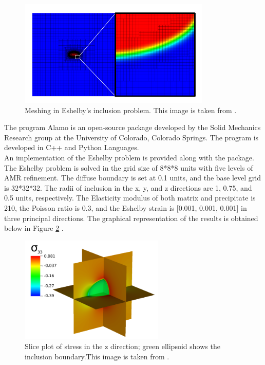 \documentclass[12pt, a4paper]{report}
\begin{document}
\begin{figure}[H]
    \centering
    \includegraphics[height =2in]{images/Eshelbygrid.png}
    \caption{Meshing in Eshelby's inclusion problem. This image is taken from \cite{Runnels_2021}.}
    \label{fig:Eshelbygrid}
\end{figure}

The program Alamo is an open-source package developed by the Solid Mechanics Research group at the University of Colorado, Colorado Springs. The program is developed in C++ and Python Languages.\\


An implementation of the Eshelby problem is provided along with the package. The Eshelby problem is solved in the grid size of 8*8*8 units with five levels of AMR refinement. The diffuse boundary is set at 0.1 units, and the base level grid is 32*32*32. The radii of inclusion in the x, y, and z directions are 1, 0.75, and 0.5 units, respectively. The Elasticity modulus of both matrix and precipitate is 210, the Poisson ratio is 0.3, and the Eshelby strain is [0.001, 0.001, 0.001] in three principal directions. The graphical representation of the results is obtained below in Figure \ref{fig:demoplot} \cite{Runnels_2021}.

\begin{figure}[H]
    \centering
    \includegraphics[height =2in]{images/demoplot.png}
    \caption{Slice plot of stress in the z direction; green ellipsoid shows the inclusion boundary.This image is taken from \cite{Runnels_2021}.}
    \label{fig:demoplot}
\end{figure}
\end{document}
